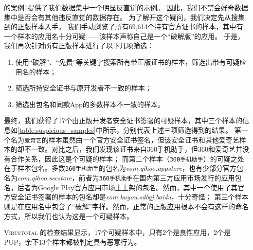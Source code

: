 的案例1提供了我们数据集中一个明显反直觉的示例。
因此，我们不禁会好奇数据集中是否会有其他违反直觉的数据存在。
为了解开这个疑问，我们决定先从搜集到的正版样本入手。
我们手动浏览了所有69,614个持有官方证书的样本，其中有一个样本的应用名十分可疑——该样本声称自己是一个``破解版''的应用。
于是，我们再次针对所有正版样本进行了以下几项筛选：
\begin{enumerate}
	\item 使用``破解''、``免费''等关键字搜索所有带正版证书的样本，筛选出带有可疑应用名的样本；
	\item 筛选所持安全证书与原开发者不一致的样本；
	\item 筛选出包名和同款App的多数样本不一致的样本。
\end{enumerate}

最终，我们获得了17个由正版开发者安全证书签署的可疑样本，其中三个样本的信息如\autoref{table:suspicious_samples}中所示，分别代表上述三项筛选得到的结果。
第一个名为\texttt{爱奇艺}的样本虽然由一个官方安全证书签名，但该安全证书和其他爱奇艺样本的却不一致。对比之后，我们发现该证书来自360手机助手，但360和爱奇艺并没有合作关系，因此这是个可疑的样本；
而第二个样本（\texttt{360手机助手}）的可疑之处在于样本包名。多数\texttt{360手机助手}的包名为\emph{com.qihoo.appstore}，也有少部分官方包名为\emph{com.qihoo.secstore}，前者为\texttt{360手机助手}在国内第三方应用市场发行的应用包名，后者为Google Play官方应用市场上上架的包名。然而，其中一个使用了其官方安全证书签署的样本的包名却是\emph{com.kuyou.sdbgj.baidu}，十分奇怪；
第三个样本则是在应用名中包含了``破解''字样。然而，正常的正版应用根本不会有这样的命名方式，所以我们也认为这是一个可疑样本。

\textsc{Virustotal} 的检查结果显示，17个可疑样本中，只有2个是良性应用，2个是PUP，余下13个样本都被判定具有恶意行为。

